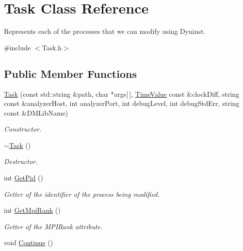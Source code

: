 \hypertarget{class_task}{\section{Task Class Reference}
\label{class_task}
}


Represents each of the processes that we can modify using Dyninst.  




{\ttfamily \#include $<$Task.\-h$>$}

\subsection*{Public Member Functions}
\begin{DoxyCompactItemize}
\item 
\hyperlink{class_task_a9ee6282b02f7482503aec3ba06bed4ec}{Task} (const std\-::string \&path, char $\ast$args\mbox{[}$\,$\mbox{]}, \hyperlink{class_common_1_1_time_value}{Time\-Value} const \&clock\-Diff, string const \&analyzer\-Host, int analyzer\-Port, int debug\-Level, int debug\-Std\-Err, string const \&D\-M\-Lib\-Name)
\begin{DoxyCompactList}\small\item\em Constructor. \end{DoxyCompactList}\item 
\hypertarget{class_task_a3ecf499ea35fb4a96853969a1e1cbbce}{\hyperlink{class_task_a3ecf499ea35fb4a96853969a1e1cbbce}{$\sim$\-Task} ()}\label{class_task_a3ecf499ea35fb4a96853969a1e1cbbce}

\begin{DoxyCompactList}\small\item\em Destructor. \end{DoxyCompactList}\item 
int \hyperlink{class_task_a73c8e2b6750749bd9e47b8aff2eb1f82}{Get\-Pid} ()
\begin{DoxyCompactList}\small\item\em Getter of the identifier of the process being modified. \end{DoxyCompactList}\item 
\hypertarget{class_task_a819086ab95a2dd56f2d7817e17a72305}{int \hyperlink{class_task_a819086ab95a2dd56f2d7817e17a72305}{Get\-Mpi\-Rank} ()}\label{class_task_a819086ab95a2dd56f2d7817e17a72305}

\begin{DoxyCompactList}\small\item\em Getter of the M\-P\-I\-Rank attribute. \end{DoxyCompactList}\item 
\hypertarget{class_task_a9c91bd3729255eea4a17829475d61199}{void \hyperlink{class_task_a9c91bd3729255eea4a17829475d61199}{Continue} ()}\label{class_task_a9c91bd3729255eea4a17829475d61199}


\end{DoxyCompactItemize}
